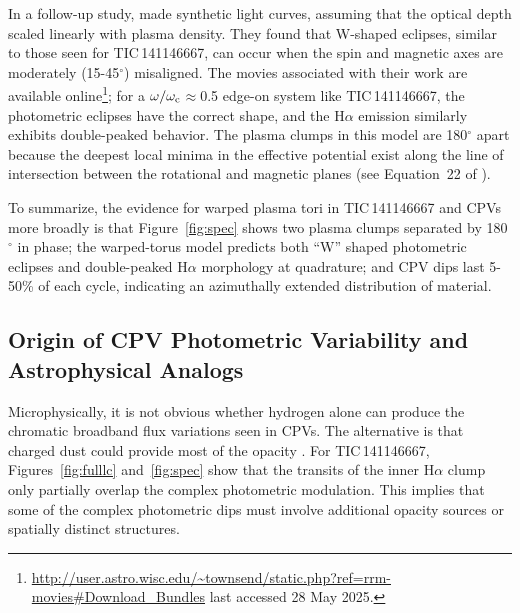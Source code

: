 \documentclass[11pt,twocolumn,tighten]{aastex7}
\begin{document}
In a follow-up study, \citet{Townsend2008} made synthetic light
curves, assuming that the optical depth scaled linearly with plasma
density.  They found that W-shaped eclipses, similar to those seen for
TIC\,141146667, can occur when the spin and magnetic axes are
moderately (15-45$^\circ$) misaligned.  The movies associated with
their work are available
online\footnote{\url{http://user.astro.wisc.edu/\~townsend/static.php?ref=rrm-movies\#Download\_Bundles}
last accessed 28 May 2025.}; for a $\omega/\omega_{\rm
c}$$\approx$0.5 edge-on system like TIC\,141146667, the photometric
eclipses have the correct shape, and the H$\alpha$ emission similarly
exhibits double-peaked behavior.  The plasma clumps in this model are
180$^\circ$ apart because the deepest local minima in the effective
potential exist along the line of intersection between the rotational
and magnetic planes (see Equation~22 of \citealt{Townsend2005}).  

To summarize, the evidence for warped plasma tori in TIC\,141146667
and CPVs more broadly is that Figure~\ref{fig:spec} shows two plasma
clumps separated by 180$^\circ$ in phase; the warped-torus model
predicts both ``W'' shaped photometric eclipses and double-peaked
H$\alpha$ morphology at quadrature; and CPV dips last 5-50\% of each
cycle, indicating an azimuthally extended distribution of material.

\subsection{Origin of CPV Photometric Variability and Astrophysical Analogs}

Microphysically, it is not obvious whether hydrogen alone can produce
the chromatic broadband flux variations seen in CPVs.  The alternative
is that charged dust could provide most of the opacity
\citep{Sanderson2023}.  For TIC\,141146667, Figures~\ref{fig:fulllc}
and~\ref{fig:spec} show that the transits of the inner H$\alpha$ clump
only partially overlap the complex photometric modulation.  This
implies that some of the complex photometric dips must involve
additional opacity sources or spatially distinct structures.
\end{document}
